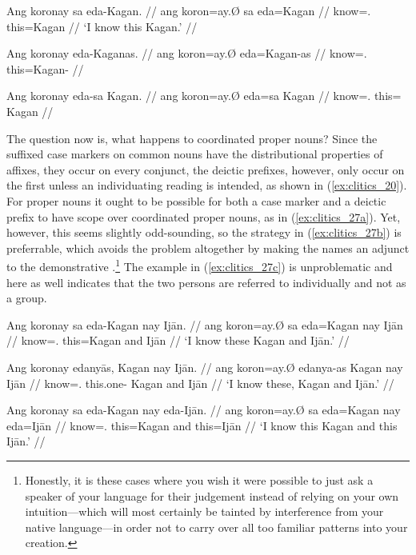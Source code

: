 \pex\label{ex:clitics_26}
\a\label{ex:clitics_26a}\begingl
	\gla Ang koronay sa eda-Kagan. //
	\glb ang koron=ay.Ø sa eda=Kagan //
	\glc \AgtT{} know=\Fsg{}.\Top{} \Parg{} this=Kagan //
	\glft `I know this Kagan.' //
\endgl

\a\label{ex:clitics_26b}\ljudge{*}\begingl
	\gla Ang koronay eda-Kaganas. //
	\glb ang koron=ay.Ø eda=Kagan-as //
	\glc \AgtT{} know=\Fsg{}.\Top{} this=Kagan-\Parg{} //
\endgl

\a\label{ex:clitics_26c}\ljudge{*}\begingl
	\gla Ang koronay eda-sa Kagan. //
	\glb ang koron=ay.Ø eda=sa Kagan //
	\glc \AgtT{} know=\Fsg{}.\Top{} this=\Parg{} Kagan //
\endgl
\xe

The question now is, what happens to coordinated proper nouns? Since the
suffixed case markers on common nouns have the distributional properties of
affixes, they occur on every conjunct, the deictic prefixes, however, only
occur on the first unless an individuating reading is intended, as shown in
(\ref{ex:clitics_20}). For proper nouns it ought to be possible for both a case
marker and a deictic prefix to have scope over coordinated proper nouns, as in
(\ref{ex:clitics_27a}). Yet, however, this seems slightly odd-sounding, so the
strategy in (\ref{ex:clitics_27b}) is preferrable, which avoids the problem
altogether by making the names an adjunct to the demonstrative
.\footnote{Honestly, it is these cases
where you wish it were possible to just ask a speaker of your language for
their judgement instead of relying on your own intuition---which will most
certainly be tainted by interference from your native language---in order not
to carry over all too familiar patterns into your creation.} The example in
(\ref{ex:clitics_27c}) is unproblematic and here as well indicates that the two
persons are referred to individually and not as a group.

\pex\label{ex:clitics_27}
\a\label{ex:clitics_27a}\begingl
	\gla Ang koronay sa eda-​Kagan nay Ijān. //
	\glb ang koron=ay.Ø sa eda=Kagan nay Ijān //
	\glc \AgtT{} know=\Fsg{}.\Top{} \Parg{} this=​Kagan and Ijān //
	\glft `I know these Kagan and Ijān.' //
\endgl

\a\label{ex:clitics_27b}\begingl
	\gla Ang koronay edanyās, Kagan nay Ijān. //
	\glb ang koron=ay.Ø edanya-as Kagan nay Ijān //
	\glc \AgtT{} know=\Fsg{}.\Top{} this.one-\Parg{} Kagan and Ijān //
	\glft `I know these, Kagan and Ijān.' //
\endgl

\a\label{ex:clitics_27c}\begingl
	\gla Ang koronay sa eda-​Kagan nay eda-​Ijān. //
	\glb ang koron=ay.Ø sa eda=​Kagan nay eda=Ijān //
	\glc \AgtT{} know=\Fsg{}.\Top{} \Parg{} this=​Kagan and this=​Ijān //
	\glft `I know this Kagan and this Ijān.' //
\endgl
\xe

